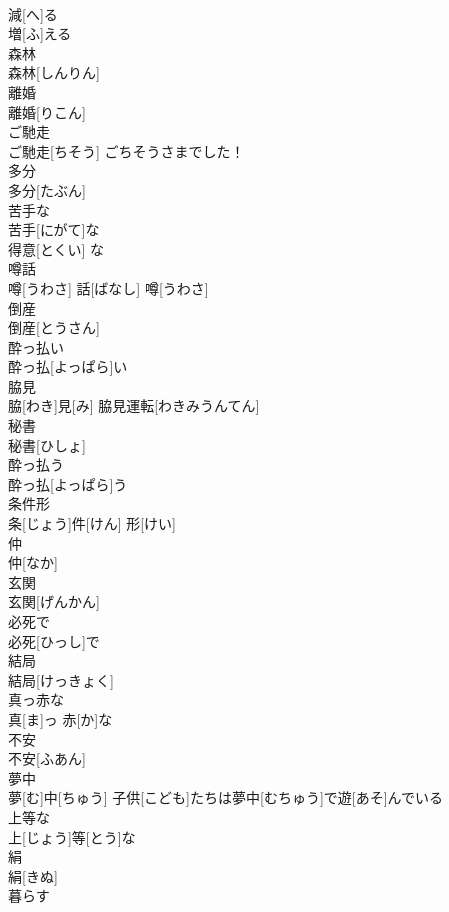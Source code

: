 \documentclass[8pt]{extreport}
\begin{document}
\begin{CJK}{UTF8}{min}
\\	減[へ]る	
\\	増[ふ]える 
\\	森林	
\\	森林[しんりん]	
\\	離婚	
\\	離婚[りこん]	
\\	ご馳走	
\\	ご馳走[ちそう]	ごちそうさまでした！
\\	多分	
\\	多分[たぶん]	
\\	苦手な	
\\	苦手[にがて]な	
\\	得意[とくい] な 
\\	噂話	
\\	噂[うわさ] 話[ばなし]	噂[うわさ] 
\\	倒産	
\\	倒産[とうさん]	
\\	酔っ払い	
\\	酔っ払[よっぱら]い	
\\	脇見	
\\	脇[わき]見[み]	脇見運転[わきみうんてん]　
\\	秘書	
\\	秘書[ひしょ]	
\\	酔っ払う	
\\	酔っ払[よっぱら]う	
\\	条件形	
\\	条[じょう]件[けん] 形[けい]	
\\	仲	
\\	仲[なか]	
\\	玄関	
\\	玄関[げんかん]	
\\	必死で	
\\	必死[ひっし]で	
\\	結局	
\\	結局[けっきょく]	
\\	真っ赤な	
\\	真[ま]っ 赤[か]な	
\\	不安	
\\	不安[ふあん]	
\\	夢中	
\\	夢[む]中[ちゅう]	子供[こども]たちは夢中[むちゅう]で遊[あそ]んでいる 
\\	上等な	
\\	上[じょう]等[とう]な	
\\	絹	
\\	絹[きぬ]	
\\	暮らす	

\end{CJK}
\end{document}
